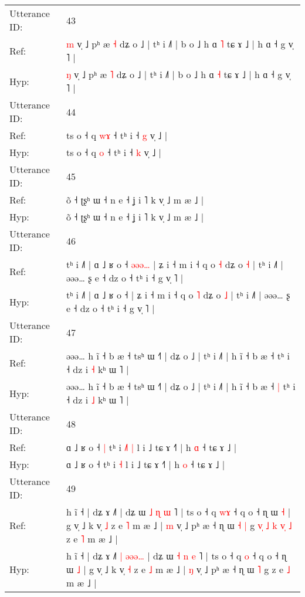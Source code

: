 \documentclass[10pt]{article}
\DeclareRobustCommand{\hl}[1]{{\textcolor{red}{#1}}}
\begin{document}
\begin{longtable}{ll}
 \\
\midrule
Utterance ID: & 43 \\
Ref: & \hl{m} v̩ ˩ pʰ æ \hl{˧} dʑ o ˩ | tʰ i ˩˥ | b o ˩ h ɑ \hl{˥} tɕ ɤ ˩ | h ɑ ˧ g v̩ ˥ |
 \\
Hyp: & \hl{ŋ} v̩ ˩ pʰ æ \hl{˥} dʑ o ˩ | tʰ i ˩˥ | b o ˩ h ɑ \hl{˧} tɕ ɤ ˩ | h ɑ ˧ g v̩ ˥ |
 \\
\midrule
Utterance ID: & 44 \\
Ref: & ts o ˧ q \hl{w}\hl{ɤ} ˧ tʰ i ˧ \hl{g} v̩ ˩ |
 \\
Hyp: & ts o ˧ q \hl{}\hl{o} ˧ tʰ i ˧ \hl{k} v̩ ˩ |
 \\
\midrule
Utterance ID: & 45 \\
Ref: & õ ˧ ʈʂʰ ɯ ˧ n e ˧ ʝ i ˥ k v̩ ˩ m æ ˩ |
 \\
Hyp: & õ ˧ ʈʂʰ ɯ ˧ n e ˧ ʝ i ˥ k v̩ ˩ m æ ˩ |
 \\
\midrule
Utterance ID: & 46 \\
Ref: & tʰ i ˩˥ | ɑ ˩ ʁ o ˧\hl{ }\hl{ə}\hl{ə}\hl{ə}\hl{…} | ʑ i ˧ m i ˧ q o \hl{˧} dʑ o \hl{˧} | tʰ i ˩˥ | əəə… ʂ e ˧ dz o ˧ tʰ i ˧ g v̩ ˥ |
 \\
Hyp: & tʰ i ˩˥ | ɑ ˩ ʁ o ˧\hl{}\hl{}\hl{}\hl{}\hl{} | ʑ i ˧ m i ˧ q o \hl{˥} dʑ o \hl{˩} | tʰ i ˩˥ | əəə… ʂ e ˧ dz o ˧ tʰ i ˧ g v̩ ˥ |
 \\
\midrule
Utterance ID: & 47 \\
Ref: & əəə… h ĩ ˧ b æ ˧ tsʰ ɯ ˧˥ | dʑ o ˩ | tʰ i ˩˥ | h ĩ ˧ b æ ˧\hl{}\hl{} tʰ i ˧ dz i \hl{˧} kʰ ɯ ˥ |
 \\
Hyp: & əəə… h ĩ ˧ b æ ˧ tsʰ ɯ ˧˥ | dʑ o ˩ | tʰ i ˩˥ | h ĩ ˧ b æ ˧\hl{ }\hl{|} tʰ i ˧ dz i \hl{˩} kʰ ɯ ˥ |
 \\
\midrule
Utterance ID: & 48 \\
Ref: & ɑ ˩ ʁ o ˧\hl{ }\hl{|} tʰ i\hl{ }\hl{˩}\hl{˥} \hl{|} l i ˩ tɕ ɤ ˧˥ | h \hl{ɑ} ˧ tɕ ɤ ˩ |
 \\
Hyp: & ɑ ˩ ʁ o ˧\hl{}\hl{} tʰ i\hl{}\hl{}\hl{} \hl{˧} l i ˩ tɕ ɤ ˧˥ | h \hl{o} ˧ tɕ ɤ ˩ |
 \\
\midrule
Utterance ID: & 49 \\
Ref: & h ĩ ˧ | dʑ ɤ ˩˥\hl{}\hl{}\hl{}\hl{}\hl{}\hl{}\hl{} | dʑ ɯ \hl{˩} \hl{ɳ} \hl{ɯ} ˥ | ts o ˧ q \hl{w}\hl{ɤ} ˧ q o ˧ ɳ ɯ \hl{˧} | g v̩ ˩ k v̩ \hl{˩} z e \hl{˥} m æ ˩ | \hl{m} v̩ ˩ pʰ æ ˧ ɳ ɯ\hl{ }\hl{˧} \hl{|} g\hl{ }\hl{v}\hl{̩}\hl{ }\hl{˩}\hl{ }\hl{k}\hl{ }\hl{v}\hl{̩}\hl{ }\hl{˩} z e \hl{˥} m æ ˩ |
 \\
Hyp: & h ĩ ˧ | dʑ ɤ ˩˥\hl{ }\hl{|}\hl{ }\hl{ə}\hl{ə}\hl{ə}\hl{…} | dʑ ɯ \hl{˧} \hl{n} \hl{e} ˥ | ts o ˧ q \hl{}\hl{o} ˧ q o ˧ ɳ ɯ \hl{˩} | g v̩ ˩ k v̩ \hl{˧} z e \hl{˩} m æ ˩ | \hl{ŋ} v̩ ˩ pʰ æ ˧ ɳ ɯ\hl{}\hl{} \hl{˥} g\hl{}\hl{}\hl{}\hl{}\hl{}\hl{}\hl{}\hl{}\hl{}\hl{}\hl{}\hl{} z e \hl{˩} m æ ˩ |

\end{longtable}
\end{document}
